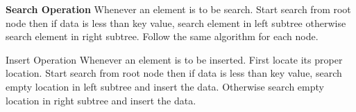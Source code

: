 \documentclass{beamer}
\begin{document}
\begin{frame}
\noindent \textbf{Search Operation}
Whenever an element is to be search. Start search from root node then if data is less than key value, search element in left subtree otherwise search element in right subtree. Follow the same algorithm for each node.
\end{frame}
%	
%	
%			
%			

\begin{frame}
Insert Operation
Whenever an element is to be inserted. First locate its proper location. Start search from root node then if data is less than key value, search empty location in left subtree and insert the data. Otherwise search empty location in right subtree and insert the data.
\end{frame}
%
%
%
%			
%				
\end{document}
